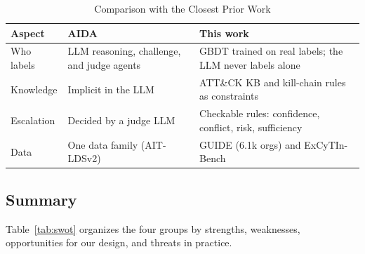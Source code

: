 \documentclass[conference]{IEEEtran}
\begin{document}
\begin{table}[t]
\caption{Comparison with the Closest Prior Work}
\label{tab:compare}
\centering
\footnotesize
\setlength{\tabcolsep}{3pt}
\begin{tabular}{@{}p{1.5cm}p{3.0cm}p{3.3cm}@{}}
\toprule
\textbf{Aspect} & \textbf{AIDA~\cite{tsegai2026}} & \textbf{This work} \\
\midrule
Who labels & LLM reasoning, challenge, and judge agents
& GBDT trained on real labels; the LLM never labels alone \\
Knowledge & Implicit in the LLM
& ATT\&CK KB and kill-chain rules as constraints \\
Escalation & Decided by a judge LLM
& Checkable rules: confidence, conflict, risk, sufficiency \\
Data & One data family (AIT-LDSv2)
& GUIDE (6.1k orgs) and ExCyTIn-Bench \\
\bottomrule
\end{tabular}
\end{table}

\subsection{Summary}
Table~\ref{tab:swot} organizes the four groups by strengths,
weaknesses, opportunities for our design, and threats in practice.
\end{document}
